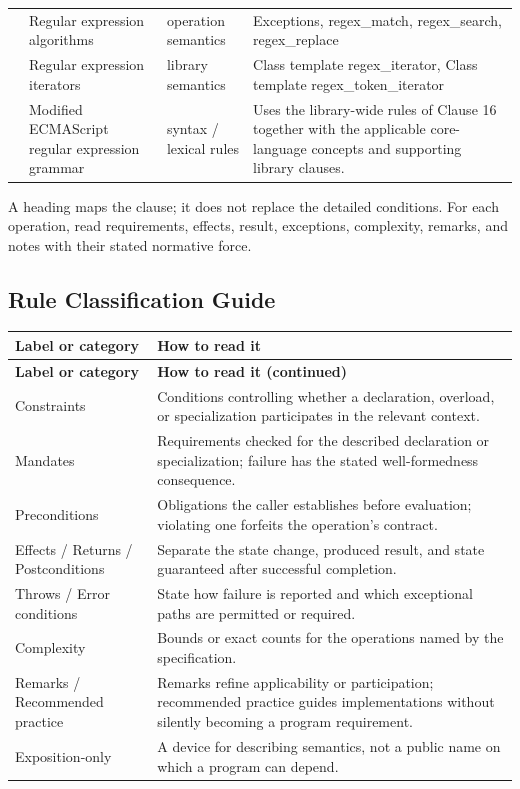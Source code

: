 \documentclass[11pt,letterpaper]{article}
\begin{document}
\begin{longtable}{@{}>{\RaggedRight\arraybackslash}p{}>{\RaggedRight\arraybackslash}p{}>{\RaggedRight\arraybackslash}p{}>{\RaggedRight\arraybackslash}p{}@{}}
32.10 & Regular expression algorithms & operation semantics & Exceptions, regex\_\allowbreak{}match, regex\_\allowbreak{}search, regex\_\allowbreak{}replace\\
32.11 & Regular expression iterators & library semantics & Class template regex\_\allowbreak{}iterator, Class template regex\_\allowbreak{}token\_\allowbreak{}iterator\\
32.12 & Modified ECMAScript regular expression grammar & syntax / lexical rules & Uses the library-wide rules of Clause 16 together with the applicable core-language concepts and supporting library clauses.\\
\end{longtable}\normalsize
\begin{CornellReferenceNormativeBox}A heading maps the clause; it does not replace the detailed conditions. For each operation, read requirements, effects, result, exceptions, complexity, remarks, and notes with their stated normative force.\end{CornellReferenceNormativeBox}
\subsection*{Rule Classification Guide}
\small\begin{longtable}{@{}>{\RaggedRight\arraybackslash}p{}>{\RaggedRight\arraybackslash}p{}@{}}\toprule\textbf{Label or category} & \textbf{How to read it}\\\midrule\endfirsthead\toprule\textbf{Label or category} & \textbf{How to read it (continued)}\\\midrule\endhead\bottomrule\endfoot
Constraints & Conditions controlling whether a declaration, overload, or specialization participates in the relevant context.\\
Mandates & Requirements checked for the described declaration or specialization; failure has the stated well-formedness consequence.\\
Preconditions & Obligations the caller establishes before evaluation; violating one forfeits the operation's contract.\\
Effects / Returns / Postconditions & Separate the state change, produced result, and state guaranteed after successful completion.\\
Throws / Error conditions & State how failure is reported and which exceptional paths are permitted or required.\\
Complexity & Bounds or exact counts for the operations named by the specification.\\
Remarks / Recommended practice & Remarks refine applicability or participation; recommended practice guides implementations without silently becoming a program requirement.\\
Exposition-only & A device for describing semantics, not a public name on which a program can depend.\\
\end{longtable}\normalsize
\end{document}

